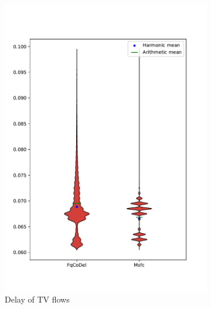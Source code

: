 \begin{figure}
\begin{subfigure}[b]{0.475\textwidth}
		\includegraphics[width=\textwidth]{drawings/type3-delay-down}
		\caption[]%
		{{\small Delay of TV flows}}    
		\label{fig:delay_tv}
	\end{subfigure}
	\par\bigskip %
	\begin{subfigure}[b]{0.475\textwidth}   
		\centering 

\end{subfigure}
\end{figure}
